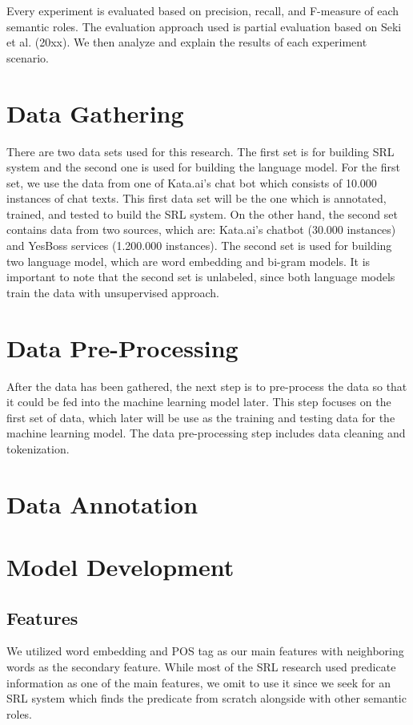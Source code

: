 Every experiment is evaluated based on precision, recall, and F-measure of each semantic roles. The evaluation approach used is partial evaluation based on Seki et al. (20xx). We then analyze and explain the results of each experiment scenario.

\section{Data Gathering}
There are two data sets used for this research. The first set is for building SRL system and the second one is used for building the language model. For the first set, we use the data from one of Kata.ai’s chat bot which consists of 10.000 instances of chat texts. This first data set will be the one which is annotated, trained, and tested to build the SRL system. On the other hand, the second set contains data from two sources, which are: Kata.ai’s chatbot (30.000 instances) and YesBoss services (1.200.000 instances). The second set is used for building two language model, which are word embedding and bi-gram models. It is important to note that the second set is unlabeled, since both language models train the data with unsupervised approach.

\section{Data Pre-Processing}
After the data has been gathered, the next step is to pre-process the data so that it could be fed into the machine learning model later. This step focuses on the first set of data, which later will be use as the training and testing data for the machine learning model. The data pre-processing step includes data cleaning and tokenization.

\section{Data Annotation}

\section{Model Development}

\subsection{Features}
We utilized word embedding and POS tag as our main features with neighboring words as the secondary feature. While most of the SRL research used predicate information as one of the main features, we omit to use it since we seek for an SRL system which finds the predicate from scratch alongside with other semantic roles.

